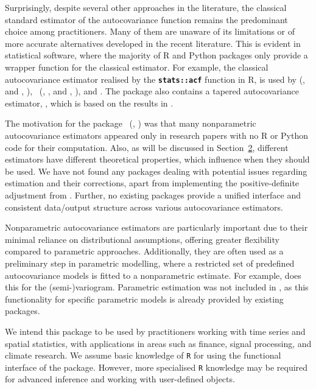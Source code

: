 Surprisingly, despite several other approaches in the literature, the classical standard estimator of the autocovariance function remains the predominant choice among practitioners.  Many of them are unaware of its limitations or of more accurate alternatives developed in the recent literature. This is evident in statistical software, where the majority of R and Python packages only provide a wrapper function for the classical estimator. For example, the classical autocovariance estimator realised by the \textbf{\texttt{stats::acf}} function in R,  is used by  (\citeauthor{TSA_2022}, \citeyear{TSA_2022} and \citeauthor{Cryer2008}, \citeyear{Cryer2008}), ~(\citeauthor{astsa_2024}, \citeyear{astsa_2024}, and \citeauthor{Shumway2025}, \citeyear{Shumway2025}),  \citep{sarima_2024} and  \citep{Hyndman2008}. The package  also contains a tapered autocovariance estimator, , which is based on the results in \cite{McMurry2010, Hyndman2015}.

The motivation for the package ~(\citeauthor{CovEsts_2025}, \citeyear{CovEsts_2025}) was that many nonparametric autocovariance estimators appeared only in research papers with no R or Python code for their computation. Also, as will be discussed in Section~\hyperref[sec:nonparametric]{2}, different estimators have different theoretical properties, which influence when they should be used. We have not found any packages dealing with potential issues regarding estimation and their corrections, apart from  \citep{ncf} implementing the positive-definite adjustment from \cite{hall1994_2}. Further, no existing packages provide a unified interface and consistent data/output structure across various autocovariance estimators.

Nonparametric autocovariance estimators are particularly important due to their minimal reliance on distributional assumptions, offering greater flexibility compared to parametric approaches. Additionally, they are often used as a preliminary step in parametric modelling, where a restricted set of predefined autocovariance models is fitted to a nonparametric estimate. For example,  \citep{gstat2016} does this for the (semi-)variogram. Parametric estimation was not included in , as this functionality for specific parametric models is already provided by existing packages.

We intend this package to be used by practitioners working with time series and spatial statistics, with applications in areas such as finance, signal processing, and climate research. We assume basic knowledge of \texttt{R} for using the functional interface of the package. However, more specialised \texttt{R} knowledge may be required for advanced inference and working with user-defined objects.

